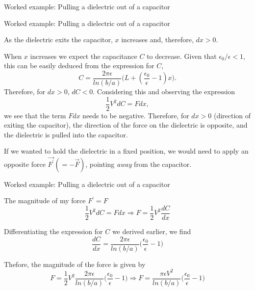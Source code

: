 {\begin{frame}{Worked example: Pulling a dielectric out of a capacitor}
\end{frame}

%
%
%

\begin{frame}{Worked example: Pulling a dielectric out of a capacitor}

  As the dielectric exits the capacitor, $x$ increases
  and, therefore, $dx > 0$.

  When $x$ increases we expect the capacitance $C$ to decrease.
  Given that $\epsilon_0/\epsilon < 1$,
  this can be easily deduced from the expression for $C$,
  \begin{equation*}
    C =
     \frac{2\pi \epsilon}{ln(b/a)}
         \Big(L + (\frac{\epsilon_0}{\epsilon}-1) x \Big).
  \end{equation*}
  Therefore, for $dx > 0$, $dC < 0$.
  Considering this and observing the expression
  \begin{equation*}
    \frac{1}{2}V^2 dC = F dx,
  \end{equation*}
  we see that the term $F dx$ needs to be negative.
  Therefore, for $dx > 0$ (direction of exiting the capacitor),
  the direction of the force on the dielectric is opposite,
  and the dielectric is pulled into the capacitor.

  If we wanted to hold the dielectric in a fixed position, we would
  need to apply an opposite force $\vec{F^\prime}(=-\vec{F})$,
  pointing {\em away} from the capacitor.

\end{frame}

%
%
%

\begin{frame}{Worked example: Pulling a dielectric out of a capacitor}

  The magnitude of my force $F^\prime=F$
  \begin{equation*}
    \frac{1}{2}V^2 dC = F dx \Rightarrow
    F = \frac{1}{2}V^2 \frac{dC}{dx}
  \end{equation*}

  Differentiating the expression for $C$ we derived earlier, we find
  \begin{equation*}
    \frac{dC}{dx} = \frac{2\pi \epsilon}{ln(b/a)}
        \Big(\frac{\epsilon_0}{\epsilon}-1\Big)
  \end{equation*}

  Thefore, the magnitude of the force is given by
  \begin{equation*}
    F = \frac{1}{2}V^2 \frac{2\pi \epsilon}{ln(b/a)}
     \Big(\frac{\epsilon_0}{\epsilon}-1\Big) \Rightarrow
    F = \frac{\pi \epsilon V^2}{ln(b/a)}
      \Big(\frac{\epsilon_0}{\epsilon}-1\Big)
  \end{equation*}

\end{frame}

} %

